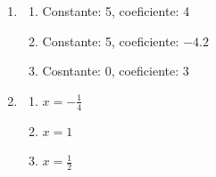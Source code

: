 \documentclass[11pt]{article}
\begin{document}
\begin{enumerate}
	\item
		\begin{enumerate}
			\item Constante: 5, coeficiente: 4
			\item Constante: 5, coeficiente: $-4.2$
			\item Cosntante: 0, coeficiente: 3
		\end{enumerate}

	\item
		\begin{enumerate}
			\item $x = -\frac{1}{4}$
			\item $x = 1$
			\item $x = \frac{1}{2}$
		\end{enumerate}
\end{enumerate}
\end{document}
